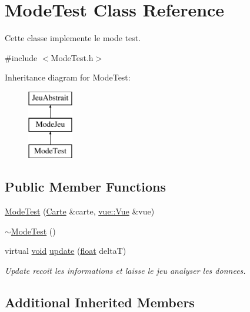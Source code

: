 \hypertarget{class_mode_test}{\section{Mode\-Test Class Reference}
\label{class_mode_test}
}


Cette classe implemente le mode test.  




{\ttfamily \#include $<$Mode\-Test.\-h$>$}

Inheritance diagram for Mode\-Test\-:\begin{figure}[H]
\begin{center}
\leavevmode
\includegraphics[height=3.000000cm]{class_mode_test}
\end{center}
\end{figure}
\subsection*{Public Member Functions}
\begin{DoxyCompactItemize}
\item 
\hyperlink{group__inf2990_gaccfe326bde07979fda160ee34f355c76}{Mode\-Test} (\hyperlink{class_carte}{Carte} \&carte, \hyperlink{classvue_1_1_vue}{vue\-::\-Vue} \&vue)
\item 
\hyperlink{group__inf2990_ga11f99d8a7a9a8bb928506ed416f6f280}{$\sim$\-Mode\-Test} ()
\item 
virtual \hyperlink{wglew_8h_aeea6e3dfae3acf232096f57d2d57f084}{void} \hyperlink{group__inf2990_gae0bec82d1b43d696e9feaff9f321f7fe}{update} (\hyperlink{fmod_8h_aeb841aa4b4b5f444b5d739d865b420af}{float} delta\-T)
\begin{DoxyCompactList}\small\item\em Update recoit les informations et laisse le jeu analyser les donnees. \end{DoxyCompactList}\end{DoxyCompactItemize}
\subsection*{Additional Inherited Members}


